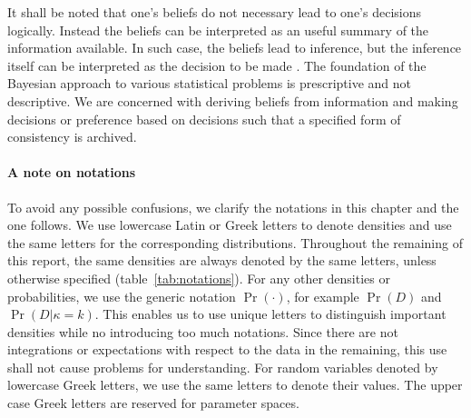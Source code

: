 It shall be noted that one's beliefs do not necessary lead to one's decisions
logically. Instead the beliefs can be interpreted as an useful summary of the
information available. In such case, the beliefs lead to inference, but the
inference itself can be interpreted as the decision to be made
\parencite[][chap.~1]{Lehmann2005}. The foundation of the Bayesian approach to
various statistical problems is prescriptive and not descriptive. We are
concerned with deriving beliefs from information and making decisions or
preference based on decisions such that a specified form of consistency is
archived.

\paragraph{A note on notations} To avoid any possible confusions, we clarify
the notations in this chapter and the one follows. We use lowercase Latin or
Greek letters to denote densities and use the same letters for the
corresponding distributions. Throughout the remaining of this report, the same
densities are always denoted by the same letters, unless otherwise specified
(table~\ref{tab:notations}). For any other densities or probabilities, we use
the generic notation $\Pr(\cdot)$, for example $\Pr(D)$ and $\Pr(D|\kappa=k)$.
This enables us to use unique letters to distinguish important densities while
no introducing too much notations. Since there are not integrations or
expectations with respect to the data in the remaining, this use shall not
cause problems for understanding. For random variables denoted by lowercase
Greek letters, we use the same letters to denote their values. The upper case
Greek letters are reserved for parameter spaces.

